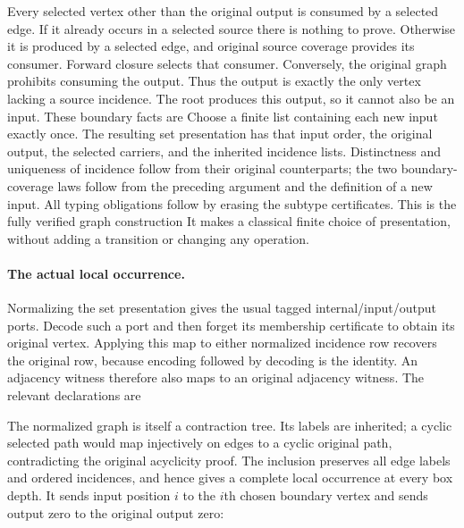 Every selected vertex other than the original output is consumed by a selected
edge. If it already occurs in a selected source there is nothing to prove.
Otherwise it is produced by a selected edge, and original source coverage
provides its consumer. Forward closure selects that consumer. Conversely, the
original graph prohibits consuming the output. Thus the output is exactly the
only vertex lacking a source incidence. The root produces this output, so it
cannot also be an input. These boundary facts are
Choose a finite list containing each new input exactly once. The resulting
set presentation has that input order, the original output, the selected
carriers, and the inherited incidence lists. Distinctness and uniqueness of
incidence follow from their original counterparts; the two boundary-coverage
laws follow from the preceding argument and the definition of a new input.
All typing obligations follow by erasing the subtype certificates. This is the
fully verified graph construction
It makes a classical finite choice of presentation, without adding a transition
or changing any operation.

\paragraph{The actual local occurrence.}
Normalizing the set presentation gives the usual tagged internal/input/output
ports. Decode such a port and then forget its membership certificate to obtain
its original vertex. Applying this map to either normalized incidence row
recovers the original row, because encoding followed by decoding is the
identity. An adjacency witness therefore also maps to an original adjacency
witness. The relevant declarations are
\par{}
The normalized graph is itself a contraction tree. Its labels are inherited;
a cyclic selected path would map injectively on edges to a cyclic original
path, contradicting the original acyclicity proof. The inclusion preserves
all edge labels and ordered incidences, and hence gives a complete local
occurrence at every box depth. It sends input position $i$ to the $i$th chosen
boundary vertex and sends output zero to the original output zero:
\par{}

